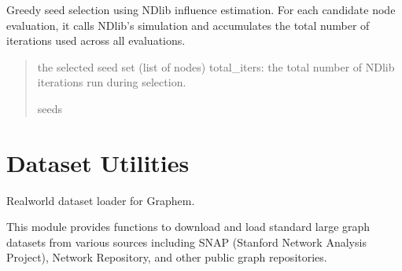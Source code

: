 \documentclass[letterpaper,10pt,english]{sphinxmanual}
\begin{document}

\begin{fulllineitems}
\label{\detokenize{api_reference:graphem.influence.greedy_seed_selection}}
\pysigstartsignatures
{}
\pysigstopsignatures
\sphinxAtStartPar
Greedy seed selection using NDlib influence estimation.
For each candidate node evaluation, it calls NDlib’s simulation and accumulates
the total number of iterations used across all evaluations.
\begin{quote}\begin{description}
\sphinxAtStartPar
the selected seed set (list of nodes)
total\_iters: the total number of NDlib iterations run during selection.

\sphinxAtStartPar
seeds

\end{description}\end{quote}

\end{fulllineitems}



\section{Dataset Utilities}
\label{\detokenize{api_reference:module-graphem.datasets}}\label{\detokenize{api_reference:dataset-utilities}}
\sphinxAtStartPar
Real\sphinxhyphen{}world dataset loader for Graphem.

\sphinxAtStartPar
This module provides functions to download and load standard large graph datasets
from various sources including SNAP (Stanford Network Analysis Project),
Network Repository, and other public graph repositories.
\end{document}
